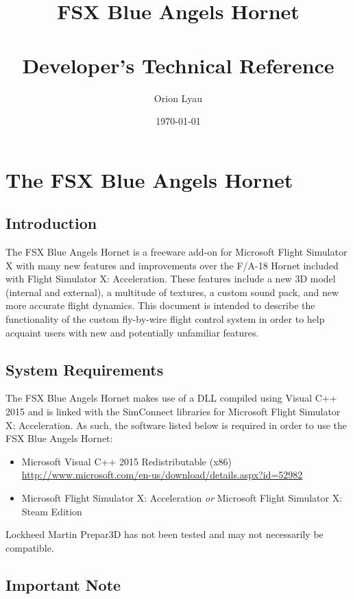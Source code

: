 \documentclass[11pt]{report}
\title{%
  FSX Blue Angels Hornet \\~\\
  \large Developer's Technical Reference}
\author{Orion Lyau}
\date{\today}
\begin{document}
\maketitle
\tableofcontents

\chapter{The FSX Blue Angels Hornet}
\label{ch:fsxba}

\section{Introduction}

The FSX Blue Angels Hornet is a freeware add-on for Microsoft Flight Simulator X with many new features and improvements over the F/A-18 Hornet included with Flight Simulator X: Acceleration.  These features include a new 3D model (internal and external), a multitude of textures, a custom sound pack, and new more accurate flight dynamics.  This document is intended to describe the functionality of the custom fly-by-wire flight control system in order to help acquaint users with new and potentially unfamiliar features.

\section{System Requirements}

The FSX Blue Angels Hornet makes use of a DLL compiled using Visual C++ 2015 and is linked with the SimConnect libraries for Microsoft Flight Simulator X: Acceleration.  As such, the software listed below is required in order to use the FSX Blue Angels Hornet:

\begin{itemize}
\item Microsoft Visual C++ 2015 Redistributable (x86) \\ \url{http://www.microsoft.com/en-us/download/details.aspx?id=52982}
\item Microsoft Flight Simulator X: Acceleration \textit{or} Microsoft Flight Simulator X: Steam Edition
\end{itemize}

Lockheed Martin Prepar3D has not been tested and may not necessarily be compatible.

\section{Important Note}
\label{sec:note}
\end{document}
